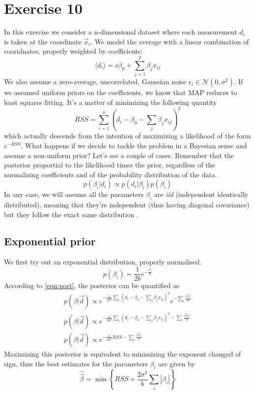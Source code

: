 \documentclass[a4paper,11pt,fleqn]{article}
\begin{document}
\section{Exercise 10}
In this exercise we consider a n-dimensional dataset where each measurement 
$d_i$ is taken at the coordinate $\vec{x}_i$. We model the average with 
a linear combination of cooridnates, properly weighted by coefficients:
\begin{equation*}
    \langle d_i \rangle = s\beta_0 + \sum_{j=1}^p \beta_j x_{ij}
\end{equation*}
We also assume a zero-average, uncorrelated, Gaussian noise $\epsilon_i \in \mathcal{N}(0,\sigma^2)$.
If we assumed uniform priors on the coefficients, we know that MAP reduces 
to least squares fitting. It's a matter of minimizing the following quantity 
\begin{equation}
    RSS = \sum_{i=1}^n (d_i - \beta_0 -\sum_j \beta_j x_{ij})^2
\end{equation}
which actually descends from the intention of maximizing a likelihood of 
the form $e^{-RSS}$.
What happens if we decide to tackle the problem in a Bayesian sense and 
assume a non-uniform prior? Let's see a couple of cases. Remember that 
the posterior proportial to the likelihood times the prior, regardless 
of the normalizing coefficients and of the probability distribution of 
the data.
\begin{equation}
    \label{eqn:post}
    p(\beta_i|d_i) \propto p(d_i|\beta_i)p(\beta_i)
\end{equation}
In any case, we will assume all the parameters $\beta_i$ are \textit{iid} 
(independent identically distributed), meaning that they're independent 
(thus having diagonal covariance) but they follow the exact same 
distribution .



\subsection{Exponential prior}
We first try out an exponential distribution, properly normalised.
\begin{equation}
    p(\beta_i) = \frac{1}{2b}e^{-\frac{\beta_i}{b}}
\end{equation}
According to \ref{eqn:post}, the posterior can be quantified as 
\begin{gather*}
    p(\beta |\vec{d}) \propto e^{-\frac{1}{2\sigma^2}\sum_i (d_i-\beta_0-\sum_j \beta_j x_{ij})^2}e^{-\sum_i \frac{|\beta_i|}{b}} \\
    p(\beta |\vec{d}) \propto e^{-\frac{1}{2\sigma^2}\sum_i (d_i-\beta_0-\sum_j \beta_j x_{ij})^2-\sum_i \frac{|\beta_i|}{b}} \\
    p(\beta |\vec{d}) \propto e^{-\frac{1}{2\sigma^2}RSS-\sum_i \frac{|\beta_i|}{b}}
\end{gather*}
Maximizing this posterior is equivalent to minimizing the exponent changed of 
sign, thus the best estimates for the parameters $\beta_i$ are given by 
\begin{equation}
    \hat{\vec{\beta}} = \min{\left\{RSS + \frac{2\sigma^2}{b}\sum_i|\beta_i|\right\}}
\end{equation}
\end{document}
